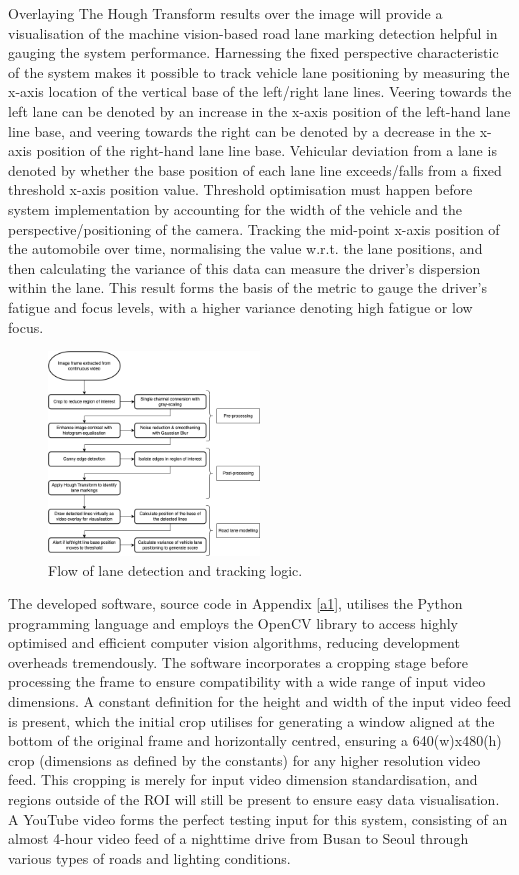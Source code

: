 \documentclass[10pt,conference]{IEEEtran}
\begin{document}
Overlaying The Hough Transform results over the image will provide a visualisation of the machine vision-based road lane marking detection helpful in gauging the system performance. Harnessing the fixed perspective characteristic of the system makes it possible to track vehicle lane positioning by measuring the x-axis location of the vertical base of the left/right lane lines. Veering towards the left lane can be denoted by an increase in the x-axis position of the left-hand lane line base, and veering towards the right can be denoted by a decrease in the x-axis position of the right-hand lane line base. Vehicular deviation from a lane is denoted by whether the base position of each lane line exceeds/falls from a fixed threshold x-axis position value. Threshold optimisation must happen before system implementation by accounting for the width of the vehicle and the perspective/positioning of the camera. Tracking the mid-point x-axis position of the automobile over time, normalising the value w.r.t. the lane positions, and then calculating the variance of this data can measure the driver's dispersion within the lane. This result forms the basis of the metric to gauge the driver's fatigue and focus levels, with a higher variance denoting high fatigue or low focus.

\begin{figure}[htbp]
    \centerline{\includegraphics[width=0.5\textwidth]{assets/lane-detection-flow.png}}
    \caption{Flow of lane detection and tracking logic.}
    \label{f1}
\end{figure}

The developed software, source code in Appendix \ref{a1}, utilises the Python programming language and employs the OpenCV library to access highly optimised and efficient computer vision algorithms, reducing development overheads tremendously. The software incorporates a cropping stage before processing the frame to ensure compatibility with a wide range of input video dimensions. A constant definition for the height and width of the input video feed is present, which the initial crop utilises for generating a window aligned at the bottom of the original frame and horizontally centred, ensuring a 640(w)x480(h) crop (dimensions as defined by the constants) for any higher resolution video feed. This cropping is merely for input video dimension standardisation, and regions outside of the ROI will still be present to ensure easy data visualisation. A YouTube video \cite{b8} forms the perfect testing input for this system, consisting of an almost 4-hour video feed of a nighttime drive from Busan to Seoul through various types of roads and lighting conditions.
\end{document}
